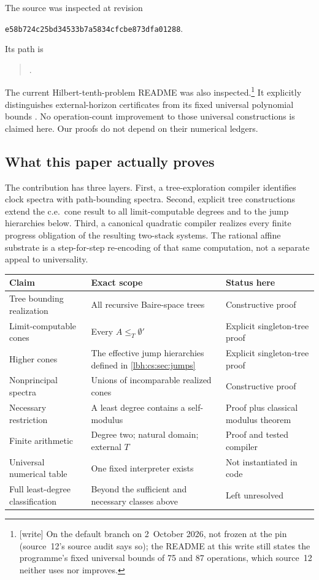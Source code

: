 \documentclass[11pt,letterpaper]{article}
\theoremstyle{definition}
\theoremstyle{remark}
\newcommand{\code}[1]{\texttt{#1}}
\newcommand{\1}{\mathbf 1}
\newcommand{\wtag}{\textup{[write]}}%
\begin{document}
The source was inspected at revision
\begin{center}\small
\code{e58b724c25bd34533b7a5834cfcbe873dfa01288}.
\end{center}
Its path is
\begin{quote}\small
{}\allowbreak
{}.
\end{quote}
The current Hilbert-tenth-problem README was also inspected.\footnote{\wtag{} On the default
branch on 2~October 2026, not frozen at the pin (source~12's source audit says so); the README at this
write still states the programme's fixed universal bounds of 75 and 87 operations, which source~12
neither uses nor improves.} It explicitly
distinguishes external-horizon certificates from its fixed universal
polynomial bounds \cite{cs-repo-readme}. No operation-count improvement to those
universal constructions is claimed here. Our proofs do not depend on their
numerical ledgers.

\subsection{What this paper actually proves}
The contribution has three layers. First, a tree-exploration compiler
identifies clock spectra with path-bounding spectra. Second, explicit tree
constructions extend the c.e.\ cone result to all limit-computable degrees
and to the jump hierarchies below. Third, a canonical quadratic compiler
realizes every finite progress obligation of the resulting two-stack
systems. The rational affine substrate is a step-for-step re-encoding of
that same computation, not a separate appeal to universality.

\begin{center}\small
\begin{tabularx}{\textwidth}{@{}p{}Xp{}@{}}
\toprule
Claim & Exact scope & Status here\\
\midrule
Tree bounding realization & All recursive Baire-space trees & Constructive proof\\
Limit-computable cones & Every $A\leq_T\emptyset'$ & Explicit singleton-tree proof\\
Higher cones & The effective jump hierarchies defined in \cref{lbh:cs:sec:jumps} & Explicit singleton-tree proof\\
Nonprincipal spectra & Unions of incomparable realized cones & Constructive proof\\
Necessary restriction & A least degree contains a self-modulus & Proof plus classical modulus theorem\\
Finite arithmetic & Degree two; natural domain; external $T$ & Proof and tested compiler\\
Universal numerical table & One fixed interpreter exists & Not instantiated in code\\
Full least-degree classification & Beyond the sufficient and necessary classes above & Left unresolved\\
\bottomrule
\end{tabularx}
\end{center}
\end{document}

